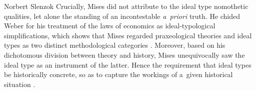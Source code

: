 \begin{artengenv}{Norbert Slenzok}
Crucially, Mises did not attribute to the ideal type nomothetic qualities, let alone the standing of an incontestable \textit{a~priori} truth. He chided Weber for his treatment of the laws of economics as ideal-typological simplifications, which shows that Mises regarded praxeological theories and ideal types as two distinct methodological categories 
\parencite[][pp.79–98]{mises_epistemological_2003}. %
 Moreover, based on his dichotomous division between theory and history, Mises unequivocally saw the ideal type as an instrument of the latter. Hence the requirement that ideal types be historically concrete, so as to capture the workings of a~given historical situation 
\parencite[][p.62]{mises_human_1998}.%





\end{artengenv}
